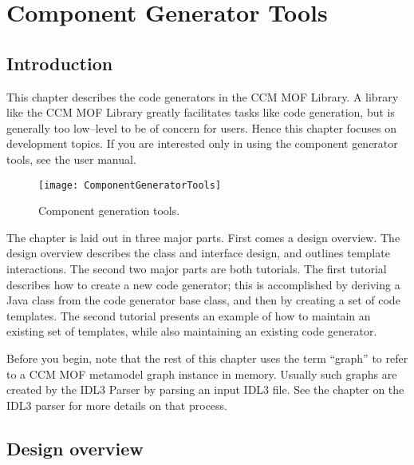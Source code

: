 \chapter{Component Generator Tools}

\section{Introduction}

This chapter describes the code generators in the CCM MOF Library. A library
like the CCM MOF Library greatly facilitates tasks like code generation, but is
generally too low--level to be of concern for users. Hence this chapter focuses
on development topics. If you are interested only in using the component
generator tools, see the user manual.

\begin{figure}
\centering
\texttt{[image: ComponentGeneratorTools]}
\caption{Component generation tools.}
\label{fig:component-generator-tools}
\end{figure}

The chapter is laid out in three major parts. First comes a design overview. The
design overview describes the class and interface design, and outlines template
interactions. The second two major parts are both tutorials. The first tutorial
describes how to create a new code generator; this is accomplished by deriving a
Java class from the code generator base class, and then by creating a set of
code templates. The second tutorial presents an example of how to maintain an
existing set of templates, while also maintaining an existing code generator.

Before you begin, note that the rest of this chapter uses the term ``graph'' to
refer to a CCM MOF metamodel graph instance in memory. Usually such graphs are
created by the IDL3 Parser by parsing an input IDL3 file. See the chapter on the
IDL3 parser for more details on that process.

\section{Design overview}

